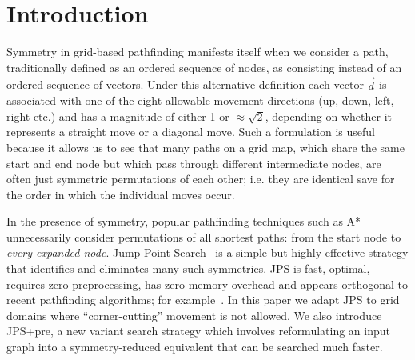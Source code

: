 \section{Introduction}
\label{sec:introduction}

Symmetry in grid-based pathfinding manifests itself when we consider a
path, traditionally defined as an ordered sequence of nodes, as consisting
instead of an ordered sequence of vectors.
Under this alternative definition each vector $\vec{d}$ is associated with 
one of the eight allowable movement directions (up, down, left, right etc.)
and has a magnitude of either 1 or $\approx\sqrt 2$, depending on whether 
it represents a straight move or a diagonal move.
Such a formulation is useful because it allows us to see that 
many paths on a grid map, which share the same start and end node but which pass through 
different intermediate nodes, are often just symmetric permutations of each other; i.e.
they are identical save for the order in which the individual moves occur.

In the presence of symmetry, popular pathfinding techniques such as 
A*~\cite{hart68} unnecessarily consider permutations 
of all shortest paths: from the start node to 
\emph{every expanded node}.
Jump Point Search~\cite{harabor11b} is a simple but highly effective strategy that
identifies and eliminates many such symmetries. 
JPS is fast, optimal, requires zero preprocessing, has zero memory overhead
and appears orthogonal to recent pathfinding algorithms; for example~\cite{bjornsson06,pochter09,goldenberg10}. 
In this paper we adapt JPS to grid domains where ``corner-cutting'' movement is not allowed.
We also introduce JPS+pre, a new variant search strategy which involves
reformulating an input graph into a symmetry-reduced equivalent that can be 
searched much faster.
